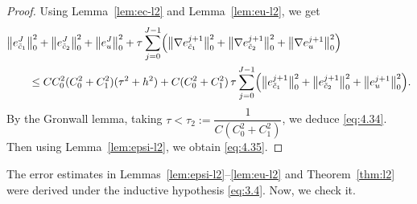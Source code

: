 \documentclass[a4paper,fleqn]{cas-sc}
\numberwithin{equation}{section}
\theoremstyle{definition}
\begin{document}
\begin{proof}
Using Lemma~\ref{lem:ec-l2} and Lemma~\ref{lem:eu-l2}, we get
\begin{align}
  &\bigl\|e_{\tilde{c}_{1}}^{J}\bigr\|_{0}^{2}
   + \bigl\|e_{\tilde{c}_{2}}^{J}\bigr\|_{0}^{2}
   + \bigl\|e_{u}^{J}\bigr\|_{0}^{2}
   + \tau\sum_{j=0}^{J-1}\Bigl(\bigl\|\nabla e_{\tilde{c}_{1}}^{j+1}\bigr\|_{0}^{2}
                               + \bigl\|\nabla e_{\tilde{c}_{2}}^{j+1}\bigr\|_{0}^{2}
                               + \bigl\|\nabla e_{u}^{j+1}\bigr\|_{0}^{2}\Bigr)
  \nonumber\\
  &\qquad \leq CC_{0}^{2}(C_{0}^{2}+C_{1}^{2})(\tau^{2}+h^{2})
   + C(C_{0}^{2}+C_{1}^{2})\,\tau\sum_{j=0}^{J-1}
     \Bigl(\bigl\|e_{\tilde{c}_{1}}^{j+1}\bigr\|_{0}^{2}
          + \bigl\|e_{\tilde{c}_{2}}^{j+1}\bigr\|_{0}^{2}
          + \bigl\|e_{u}^{j+1}\bigr\|_{0}^{2}\Bigr).
  \label{eq:4.36}
\end{align}
By the Gronwall lemma, taking $\tau < \tau_{2} := \dfrac{1}{C(C_{0}^{2}+C_{1}^{2})}$,
we deduce \eqref{eq:4.34}. Then using Lemma~\ref{lem:epsi-l2}, we obtain \eqref{eq:4.35}.
\end{proof}

The error estimates in Lemmas~\ref{lem:epsi-l2}--\ref{lem:eu-l2} and Theorem~\ref{thm:l2}
were derived under the inductive hypothesis \eqref{eq:3.4}. Now, we check it.
\end{document}
